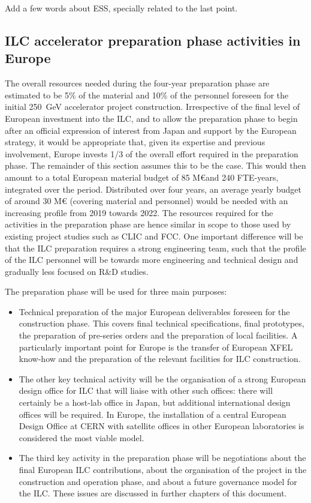 \documentclass[%
 reprint,
 amsmath,amssymb,
 aps,
]{revtex4-1}
\begin{document}
Add a few words about ESS, specially related to the last point.

\subsection{ILC accelerator preparation phase activities in Europe ~\label{sec:prepphase:accelerator}}

The overall resources needed during the four-year preparation phase are estimated to be 5\% of the material and 10\% of the personnel foreseen for the initial 250~GeV accelerator project construction. Irrespective of the final level of European investment into the ILC, and to allow the preparation phase to begin after an official expression of interest from Japan and support by the European strategy, it would be appropriate that, given its expertise and previous involvement, Europe invests 1/3 of the overall effort required in the preparation phase. The remainder of this section assumes this to be the case. This would then amount to a total European material budget of 85 M\euro and 240 FTE-years, integrated over the period.
Distributed over four years, an average yearly budget of around 30 M\euro{} (covering material and personnel) would be needed with an increasing profile from 2019 towards 2022. The resources required for the activities in the preparation phase are hence similar in scope to those used by existing project studies such as CLIC and FCC. One important difference will be that the ILC preparation requires a strong engineering team, such that the profile of the ILC personnel will be towards more engineering and technical design and gradually less focused on R\&D studies.

The preparation phase will be used for three main purposes:

\begin{itemize}
\item 
Technical preparation of the major European deliverables foreseen for the construction phase. This covers final technical specifications, final prototypes, the preparation of pre-series orders and the preparation of local facilities. A particularly important point for Europe is the transfer of European XFEL know-how and the preparation of the relevant facilities for ILC construction.
\item
The other key technical activity will be the organisation of a strong European design office for ILC that will liaise with other such offices: there will certainly be a host-lab office in Japan, but additional international design offices will be required. In Europe, the installation of a central European Design Office at CERN with satellite offices in other European laboratories is considered the most viable model.
\item 
The third key activity in the preparation phase will be negotiations about the final European ILC contributions, about the organisation of the project in the construction and operation phase, and about a future governance model for the ILC. These issues are discussed in further chapters of this document.
\end{itemize}
\end{document}
